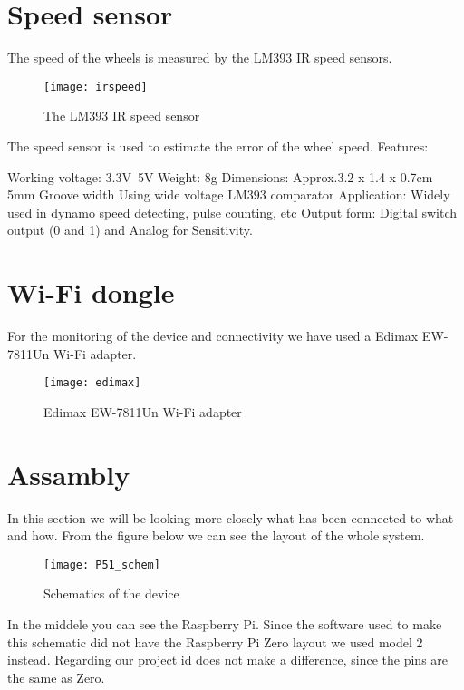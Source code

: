 \section{Speed sensor}

The speed of the wheels is measured by the LM393 IR speed sensors.

\begin{figure}[h]
\centering
\texttt{[image: irspeed]}
\caption{The LM393 IR speed sensor}
\label{fig::driver2}
\end{figure}

The speed sensor is used to estimate the error of the wheel speed.
Features:

Working voltage: 3.3V~5V
Weight: 8g
Dimensions: Approx.3.2 x 1.4 x 0.7cm
5mm Groove width
Using wide voltage LM393 comparator
Application: Widely used in dynamo speed detecting, pulse counting, etc
Output form: Digital switch output (0 and 1) and Analog for Sensitivity.


\section{Wi-Fi dongle}

For the monitoring of the device and connectivity we have used a Edimax EW-7811Un Wi-Fi adapter.

\begin{figure}[h]
\centering
\texttt{[image: edimax]}
\caption{Edimax EW-7811Un Wi-Fi adapter}
\label{fig::edimax}
\end{figure}

\section{Assambly}

In this section we will be looking more closely what has been connected to what and how.
From the figure below we can see the layout of the whole system.

\begin{figure}[h]
\centering
\texttt{[image: P51\_schem]}
\caption{Schematics of the device}
\label{fig::schematics}
\end{figure}

In the middele you can see the Raspberry Pi.
Since the software used to make this schematic did not have the Raspberry Pi Zero layout we used model 2 instead.
Regarding our project id does not make a difference, since the pins are the same as Zero.

